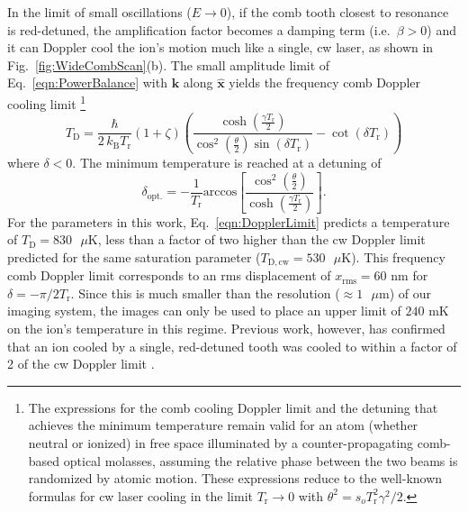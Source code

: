 \documentclass[preprint,superscriptaddress,amsmath,amssymb,aps,prl]{revtex4-1}
\begin{document}
In the limit of small oscillations ($E \rightarrow 0$), if the comb tooth closest to resonance is red-detuned, the amplification factor becomes a damping term (i.e.~$\beta>0$) and it can Doppler cool the ion's motion much like a single, cw laser, as shown in Fig.~\ref{fig:WideCombScan}(b).  The small amplitude limit of Eq.~\ref{eqn:PowerBalance} with $\mathbf{k}$ along $\hat{\mathbf{x}}$ yields the frequency comb Doppler cooling limit \footnote{The expressions for the comb cooling Doppler limit and the detuning that achieves the minimum temperature remain valid for an atom (whether neutral or ionized) in free space illuminated by a counter-propagating comb-based optical molasses, assuming the relative phase between the two beams is randomized by atomic motion.  These expressions reduce to the well-known formulas for cw laser cooling \cite{Leibfried2003quantum} in the limit $T_\mathrm{r} \rightarrow 0$ with $\theta^2 = s_o T_\mathrm{r}^2 \gamma^2/2$.}
\begin{equation}
T_\mathrm{D}=\frac{\hbar}{2\,k_\mathrm{B}T_\mathrm{r}}\left( 1 + \zeta \right)\left( \frac{\cosh\left( \frac{\gamma T_\mathrm{r}}{2} \right)}{\cos^2\left( \frac{\theta}{2} \right) \sin (\delta T_\mathrm{r})}-\cot(\delta T_\mathrm{r}) \right) \label{eqn:DopplerLimit}
\end{equation}
where $\delta < 0.$ The minimum temperature is reached at a detuning of 
\begin{equation}
\delta_\mathrm{opt.} = -\frac{1}{T_\mathrm{r}}\mathrm{arccos}\left[ \frac{\cos^2\left( \frac{\theta}{2}\right)}{ \cosh\left( \frac{\gamma T_\mathrm{r}}{2} \right)}\right].
\end{equation}
For the parameters in this work, Eq.~\ref{eqn:DopplerLimit} predicts a temperature of $T_\mathrm{D} = 830 \mbox{ }\mu\mbox{K}$, less than a factor of two higher than the cw Doppler limit predicted for the same saturation parameter ($T_\mathrm{D,cw} = 530 \mbox{ }\mu\mbox{K}$).  This frequency comb Doppler limit corresponds to an rms displacement of $x_\mathrm{rms} = 60\mbox{ nm}$ for $\delta = -\pi/2T_\mathrm{r}$.  Since this is much smaller than the resolution ($\approx 1 \mbox{ }\mu\mbox{m}$) of our imaging system, the images can only be used to place an upper limit of $240\mbox{ mK}$ on the ion's temperature in this regime. Previous work, however, has confirmed that an ion cooled by a single, red-detuned tooth was cooled to within a factor of 2 of the cw Doppler limit \cite{DavilaRodriguez2016doppler}.
\end{document}
